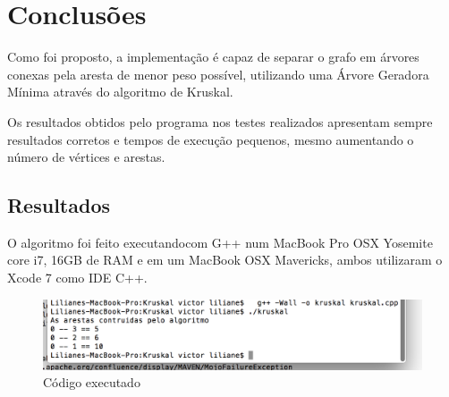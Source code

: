 \documentclass[12pt]{article}
\begin{document}
\section{Conclusões}
Como foi proposto, a implementação é capaz de separar o grafo em árvores conexas pela aresta de menor peso possível, utilizando uma Árvore Geradora Mínima através do algoritmo de Kruskal.

	Os resultados obtidos pelo programa nos testes realizados apresentam sempre resultados corretos e tempos de execução pequenos, mesmo aumentando o número de vértices e arestas.
	

\subsection{Resultados}

O algoritmo foi feito executandocom G++ num MacBook Pro OSX Yosemite core i7, 16GB de RAM e em um MacBook OSX Mavericks, ambos utilizaram o Xcode 7 como IDE C++.

\begin{figure}[ht]
    \centering
    \includegraphics[width=1\textwidth]{imagens/figura1.png}
    \caption{Código executado}
\end{figure}




\end{document}
